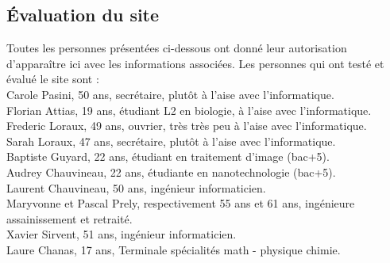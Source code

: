 \documentclass[a4paper,11pt]{article}
\begin{document}
\newpage


\subsection{Évaluation du site}

Toutes les personnes présentées ci-dessous ont donné leur autorisation d'apparaître ici avec les informations associées.
Les personnes qui ont testé et évalué le site sont :\\

Carole Pasini, 50 ans, secrétaire, plutôt à l'aise avec l'informatique.\\
Florian Attias, 19 ans, étudiant L2 en biologie, à l'aise avec l'informatique.\\
Frederic Loraux, 49 ans, ouvrier, très très peu à l'aise avec l'informatique.\\
Sarah Loraux, 47 ans, secrétaire, plutôt à l'aise avec l'informatique.\\
Baptiste Guyard, 22 ans, étudiant en traitement d'image (bac+5).\\
Audrey Chauvineau, 22 ans, étudiante en nanotechnologie (bac+5).\\
Laurent Chauvineau, 50 ans, ingénieur informaticien.\\
Maryvonne et Pascal Prely, respectivement 55 ans et 61 ans, ingénieure assainissement et retraité.\\
Xavier Sirvent, 51 ans, ingénieur informaticien.\\
Laure Chanas, 17 ans, Terminale spécialités math - physique chimie.\\
\end{document}
